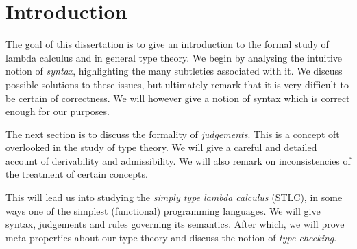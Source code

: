 \begin{comment}
\section{Introduction}

The goal of this thesis is to introduce dependent types to the undergraduate reader. We set out 

The goal of this dissertation is to learn how to mathematically design a programming language. 


The aim of this thesis is to introduce the notion of dependent types to an undergraduate reader. The main idea of dependent types is very simple, yet deceptively subtle however, since modelling such a formalism is quite tricky. This is evidenced by the fact that there is a lot of disagreement in type theory what has or hasn't been proven. This however is a familiar story in mathematics and is usually remedied by trying to understand what has been done better. Usually with the help of a new perspective. 

Dependent types however, are not only of interest to mathematicians but also programmers. Dependent type theory (much like simply typed lambda calculus) is very much a programming language allowing the expression of ideas previously too difficult to express. This is very much facilitated by its deep connection to predicate logic.
\end{comment}

\section{Introduction}

The goal of this dissertation is to give an introduction to the formal study of lambda calculus and in general type theory. We begin by analysing the intuitive notion of \emph{syntax}, highlighting the many subtleties associated with it. We discuss possible solutions to these issues, but ultimately remark that it is very difficult to be certain of correctness. We will however give a notion of syntax which is correct enough for our purposes.

The next section is to discuss the formality of \emph{judgements}. This is a concept oft overlooked in the study of type theory. We will give a careful and detailed account of derivability and admissibility. We will also remark on inconsistencies of the treatment of certain concepts.

This will lead us into studying the \emph{simply type lambda calculus} (STLC), in some ways one of the simplest (functional) programming languages. We will give syntax, judgements and rules governing its semantics. After which, we will prove meta properties about our type theory and discuss the notion of \emph{type checking}.

